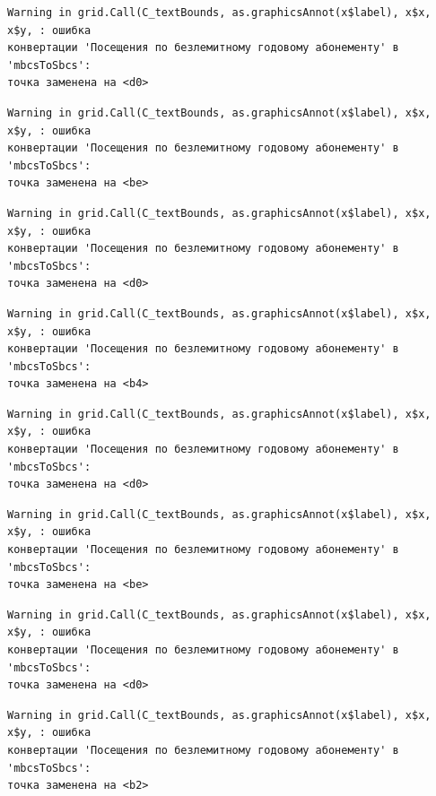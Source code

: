 \documentclass[
  letterpaper,
  DIV=11,
  numbers=noendperiod]{scrreprt}
\begin{document}
\begin{verbatim}
Warning in grid.Call(C_textBounds, as.graphicsAnnot(x$label), x$x, x$y, : ошибка
конвертации 'Посещения по безлемитному годовому абонементу' в 'mbcsToSbcs':
точка заменена на <d0>
\end{verbatim}

\begin{verbatim}
Warning in grid.Call(C_textBounds, as.graphicsAnnot(x$label), x$x, x$y, : ошибка
конвертации 'Посещения по безлемитному годовому абонементу' в 'mbcsToSbcs':
точка заменена на <be>
\end{verbatim}

\begin{verbatim}
Warning in grid.Call(C_textBounds, as.graphicsAnnot(x$label), x$x, x$y, : ошибка
конвертации 'Посещения по безлемитному годовому абонементу' в 'mbcsToSbcs':
точка заменена на <d0>
\end{verbatim}

\begin{verbatim}
Warning in grid.Call(C_textBounds, as.graphicsAnnot(x$label), x$x, x$y, : ошибка
конвертации 'Посещения по безлемитному годовому абонементу' в 'mbcsToSbcs':
точка заменена на <b4>
\end{verbatim}

\begin{verbatim}
Warning in grid.Call(C_textBounds, as.graphicsAnnot(x$label), x$x, x$y, : ошибка
конвертации 'Посещения по безлемитному годовому абонементу' в 'mbcsToSbcs':
точка заменена на <d0>
\end{verbatim}

\begin{verbatim}
Warning in grid.Call(C_textBounds, as.graphicsAnnot(x$label), x$x, x$y, : ошибка
конвертации 'Посещения по безлемитному годовому абонементу' в 'mbcsToSbcs':
точка заменена на <be>
\end{verbatim}

\begin{verbatim}
Warning in grid.Call(C_textBounds, as.graphicsAnnot(x$label), x$x, x$y, : ошибка
конвертации 'Посещения по безлемитному годовому абонементу' в 'mbcsToSbcs':
точка заменена на <d0>
\end{verbatim}

\begin{verbatim}
Warning in grid.Call(C_textBounds, as.graphicsAnnot(x$label), x$x, x$y, : ошибка
конвертации 'Посещения по безлемитному годовому абонементу' в 'mbcsToSbcs':
точка заменена на <b2>
\end{verbatim}
\end{document}
